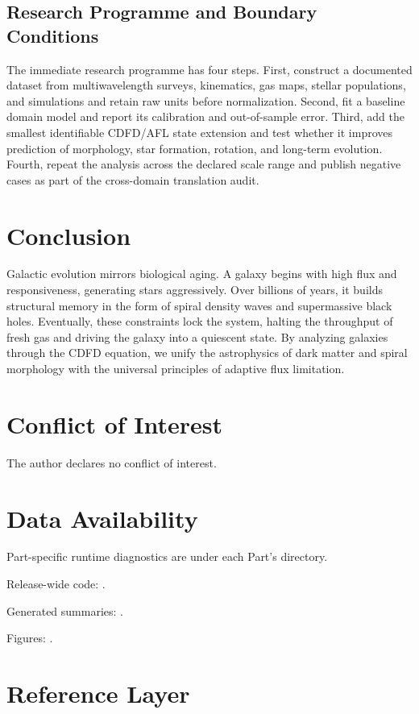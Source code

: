 \documentclass[11pt,a4paper]{article}
\begin{document}
\subsection{Research Programme and Boundary Conditions}

The immediate research programme has four steps. First, construct a documented
dataset from multiwavelength surveys, kinematics, gas maps, stellar populations, and simulations and retain raw units before normalization.
Second, fit a baseline domain model and report its calibration and out-of-sample
error. Third, add the smallest identifiable CDFD/AFL state extension and test
whether it improves prediction of morphology, star formation, rotation, and long-term evolution. Fourth, repeat the
analysis across the declared scale range and publish negative cases as part of
the cross-domain translation audit.


\section{Conclusion}
Galactic evolution mirrors biological aging. A galaxy begins with high flux and responsiveness, generating stars aggressively. Over billions of years, it builds structural memory in the form of spiral density waves and supermassive black holes. Eventually, these constraints lock the system, halting the throughput of fresh gas and driving the galaxy into a quiescent state. By analyzing galaxies through the CDFD equation, we unify the astrophysics of dark matter and spiral morphology with the universal principles of adaptive flux limitation.
\section*{Conflict of Interest} The author declares no conflict of interest.
\section*{Data Availability}
Part-specific runtime diagnostics are under each Part's  directory.

Release-wide code: .

Generated summaries: .

Figures: .


\section{Reference Layer}


\end{document}
